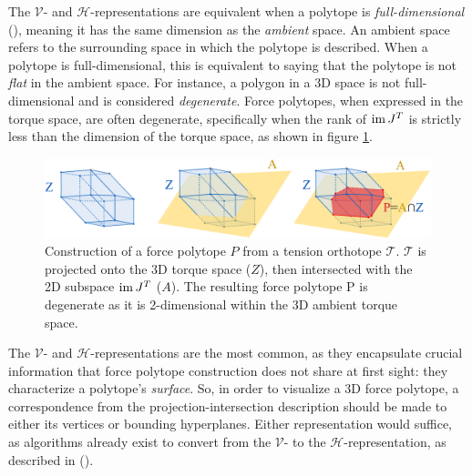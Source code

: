 The $\mathcal{V}$- and $\mathcal{H}$-representations are equivalent when a polytope is \emph{full-dimensional} (\cite{grunbaumConvexPolytopes2013}), meaning it has the same dimension as the \emph{ambient} space. An ambient space refers to the surrounding space in which the polytope is described. When a polytope is full-dimensional, this is equivalent to saying that the polytope is not \emph{flat} in the ambient space. For instance, a polygon in a 3D space is not full-dimensional and is considered \emph{degenerate}. Force polytopes, when expressed in the torque space, are often degenerate, specifically when the rank of $\operatorname{im}{J^T}$ is strictly less than the dimension of the torque space, as shown in figure \ref{fig:ffs_when_tension_set_orthotope}.
\begin{figure}[!htb]
    \captionsetup{justification=centering}
    \centering
    \includegraphics[trim={0 0 0 0}, clip, width=1\linewidth]{img/chapter_1/Polytope inter.png}
    \caption{Construction of a force polytope $P$ from a tension orthotope $\mathcal{T}$. $\mathcal{T}$ is projected onto the 3D torque space ($Z$), then intersected with the 2D subspace $\operatorname{im}{J^T}$ ($A$). The resulting force polytope P is degenerate as it is 2-dimensional within the 3D ambient torque space.}
    \label{fig:ffs_when_tension_set_orthotope}
\end{figure}

The $\mathcal{V}$- and $\mathcal{H}$-representations are the most common, as they encapsulate crucial information that force polytope construction does not share at first sight: they characterize a polytope's \emph{surface}. So, in order to visualize a 3D force polytope, a correspondence from the projection-intersection description should be made to either its vertices or bounding hyperplanes. Either representation would suffice, as algorithms already exist to convert from the $\mathcal{V}$- to the $\mathcal{H}$-representation, as described in (\cite{avisPivotingAlgorithmConvex}).

